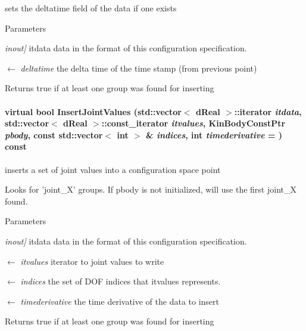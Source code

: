sets the deltatime field of the data if one exists 


\begin{DoxyParams}{Parameters}
\item[{\em inout\mbox{]}}]itdata data in the format of this configuration specification. \item[\mbox{$\leftarrow$} {\em deltatime}]the delta time of the time stamp (from previous point) \end{DoxyParams}
\begin{DoxyReturn}{Returns}
true if at least one group was found for inserting 
\end{DoxyReturn}
\hypertarget{classOpenRAVE_1_1ConfigurationSpecification_a9c074a4751be2ad6464d90a58bc316fd}{
\paragraph[{InsertJointValues}]{\setlength{\rightskip}{0pt plus 5cm}virtual bool InsertJointValues (std::vector$<$ dReal $>$::iterator {\em itdata}, \/  std::vector$<$ dReal $>$::const\_\-iterator {\em itvalues}, \/  KinBodyConstPtr {\em pbody}, \/  const std::vector$<$ int $>$ \& {\em indices}, \/  int {\em timederivative} = {}) const}\hfill}
\label{classOpenRAVE_1_1ConfigurationSpecification_a9c074a4751be2ad6464d90a58bc316fd}


inserts a set of joint values into a configuration space point 

Looks for 'joint\_\-X' groups. If pbody is not initialized, will use the first joint\_\-X found. 
\begin{DoxyParams}{Parameters}
\item[{\em inout\mbox{]}}]itdata data in the format of this configuration specification. \item[\mbox{$\leftarrow$} {\em itvalues}]iterator to joint values to write \item[\mbox{$\leftarrow$} {\em indices}]the set of DOF indices that itvalues represents. \item[\mbox{$\leftarrow$} {\em timederivative}]the time derivative of the data to insert \end{DoxyParams}
\begin{DoxyReturn}{Returns}
true if at least one group was found for inserting 
\end{DoxyReturn}
